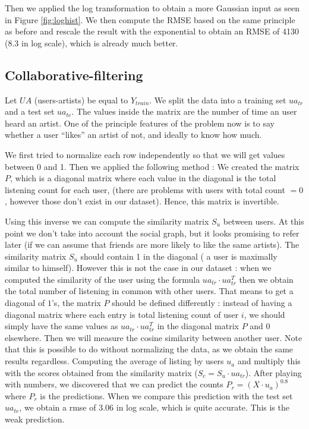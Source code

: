 \documentclass{article} %
\begin{document}
Then we applied the log transformation to obtain a more Gaussian input as seen in Figure \ref{fig:loghist}. We then compute the RMSE based on the same principle as before and rescale the result with the exponential to obtain an RMSE of 4130 (8.3 in log scale), which is already much better.

\subsection{Collaborative-filtering}
Let $UA$ (users-artists) be equal to $Y_{train}$. We split the data into a training set $ua_{tr}$ and a test set $ua_{te}$. The values inside the matrix are the number of time an user heard an artist. One of the principle features of the problem now is to say whether a user “likes” an artist of not, and ideally to know how much.

We first tried to normalize each row independently so that we will get values between 0 and 1.  Then we applied the following method : We created the matrix $P$, which is a diagonal matrix where each value in the diagonal is the total listening count for each user, (there are problems with users with total count $= 0$, however those don’t exist in our dataset). Hence, this matrix is invertible.

Using this inverse we can compute the similarity matrix $S_u$ between users. At this point we don’t take into account the social graph, but it looks promising to refer later (if we can assume that friends are more likely to like the same artists). The similarity matrix $S_u$ should contain 1 in the diagonal ( a user is maximally similar to himself). However this is not the case in our dataset : when we computed the similarity of the user using the formula $ua_{tr}\cdot ua_{tr}^T$ then we obtain the total number of listening in common with other users. That means to get a diagonal of $1$’s, the matrix $P$ should be defined differently : instead of having a diagonal matrix where each entry is  total listening count of user $i$, we should simply have the same values as $ua_{tr} \cdot ua_{tr}^T$ in the diagonal matrix $P$ and $0$ elsewhere. Then we will measure the cosine similarity between another user. Note that this is possible to do without normalizing the data, as we obtain the same results regardless. Computing the average of listing by users $u_a$ and multiply this with the scores obtained from the similarity matrix ($S_c = S_u \cdot ua_{tr}$). After playing with numbers, we discovered that we can predict the counts $P_r = (X\cdot u_a)^{0.8}$ where $P_r$ is the predictions. When we compare this prediction with the test set $ua_{te}$, we obtain a rmse of $3.06$ in log scale, which is quite accurate. This is the weak prediction.
\end{document}

